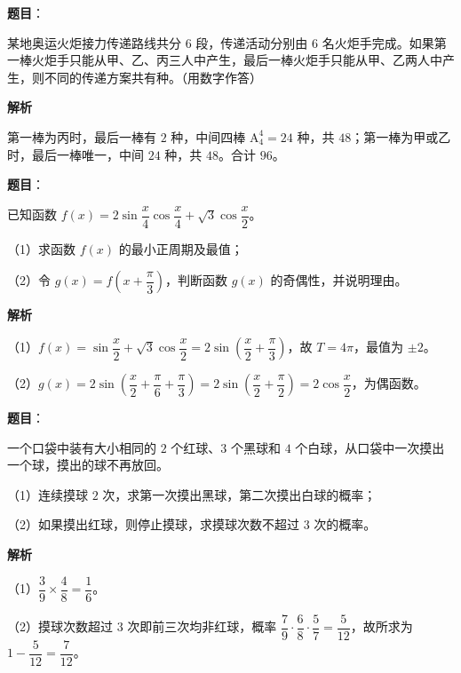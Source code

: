 \begin{answer}

\textbf{题目}：

某地奥运火炬接力传递路线共分 $6$ 段，传递活动分别由 $6$ 名火炬手完成。如果第一棒火炬手只能从甲、乙、丙三人中产生，最后一棒火炬手只能从甲、乙两人中产生，则不同的传递方案共有\gkblank{}种。（用数字作答）

\textbf{解析}

第一棒为丙时，最后一棒有 $2$ 种，中间四棒 $\mathrm A_4^4=24$ 种，共 $48$；第一棒为甲或乙时，最后一棒唯一，中间 $24$ 种，共 $48$。合计 $96$。


\end{answer}
\begin{answer}

\textbf{题目}：

已知函数 $f(x)=2\sin\dfrac x4\cos\dfrac x4+\sqrt3\cos\dfrac x2$。

（1）求函数 $f(x)$ 的最小正周期及最值；

（2）令 $g(x)=f\left(x+\dfrac{\pi}3\right)$，判断函数 $g(x)$ 的奇偶性，并说明理由。

\textbf{解析}

（1）$f(x)=\sin\dfrac x2+\sqrt3\cos\dfrac x2=2\sin\left(\dfrac x2+\dfrac{\pi}3\right)$，故 $T=4\pi$，最值为 $\pm2$。

（2）$g(x)=2\sin\left(\dfrac x2+\dfrac{\pi}6+\dfrac{\pi}3\right)=2\sin\left(\dfrac x2+\dfrac{\pi}2\right)=2\cos\dfrac x2$，为偶函数。


\end{answer}
\begin{answer}

\textbf{题目}：

一个口袋中装有大小相同的 $2$ 个红球、$3$ 个黑球和 $4$ 个白球，从口袋中一次摸出一个球，摸出的球不再放回。

（1）连续摸球 $2$ 次，求第一次摸出黑球，第二次摸出白球的概率；

（2）如果摸出红球，则停止摸球，求摸球次数不超过 $3$ 次的概率。

\textbf{解析}

（1）$\dfrac39\times\dfrac48=\dfrac16$。

（2）摸球次数超过 $3$ 次即前三次均非红球，概率 $\dfrac79\cdot\dfrac68\cdot\dfrac57=\dfrac5{12}$，故所求为 $1-\dfrac5{12}=\dfrac7{12}$。


\end{answer}
